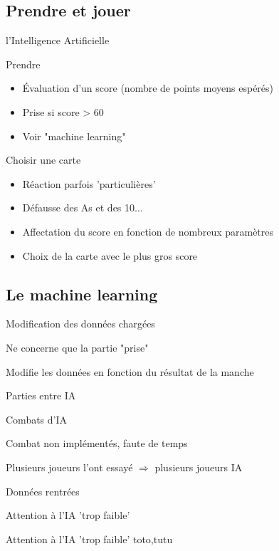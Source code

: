\documentclass[c,12pt]{beamer}
\begin{document}
	\subsection{Prendre et jouer}
\begin{frame}{l'Intelligence Artificielle}
	\onslide<2-> {
	\begin{block}{Prendre}
		\begin{itemize}
			\item \'Evaluation d'un score (nombre de points moyens espérés)
			\item Prise si score > 60
			\item Voir "machine learning"
		\end{itemize}
	\end{block}}
	 {
	\begin{block}{Choisir une carte}
		\begin{itemize}
			\item Réaction parfois 'particulières'
			\item Défausse des As et des 10...
			\item Affectation du score en fonction de nombreux paramètres
			\item Choix de la carte avec le plus gros score
		\end{itemize}
	\end{block}}
\end{frame}
	\subsection{Le machine learning}
\begin{frame}{Modification des données chargées}
\begin{itemize}
	 {\item Ne concerne que la partie "prise"}
	\newline
	 {\item Modifie les données en fonction du résultat de la manche}
	\newline
	 {\item Parties entre IA}
\end{itemize}
\end{frame}
\begin{frame}{Combats d'IA}
\begin{itemize}
	 {\item Combat non implémentés, faute de temps}
	\newline
	 {\item Plusieurs joueurs l'ont essayé $\Rightarrow$ plusieurs joueurs IA}
	\newline
	 {\item Données rentrées}
	\newline
	 {\item Attention à l'IA 'trop faible' }
	 {\item Attention à l'IA 'trop faible' toto,tutu}
\end{itemize}
\end{frame}
\end{document}
